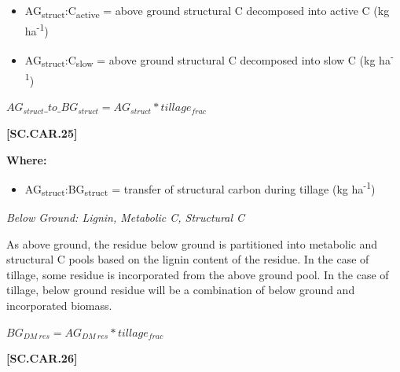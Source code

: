         \begin{itemize}
            \item AG\textsubscript{struct}:C\textsubscript{active} = above ground structural C decomposed into active C (kg ha\textsuperscript{-1})
            \item AG\textsubscript{struct}:C\textsubscript{slow} = above ground structural C decomposed into slow C (kg ha\textsuperscript{-1})
        \end{itemize}
        \vspace{0.5cm}

    \begin{center}
\(AG_{struct}\_to\_BG_{struct}=AG_{struct} * tillage_{frac}\)
    \end{center}
        \vspace{0.5cm} 
    
            {\raggedleft \textbf{[SC.CAR.25]}\par}
            \vspace{0.5cm}

        \textbf{Where:}

        \begin{itemize}
            \item AG\textsubscript{struct}:BG\textsubscript{struct} = transfer of structural carbon during tillage (kg ha\textsuperscript{-1})
        \end{itemize}
        \vspace{0.5cm}

\textit{Below Ground: Lignin, Metabolic C, Structural C}
\vspace{0.2cm}

As above ground, the residue below ground is partitioned into metabolic and structural C pools based on the lignin content of the residue. In the case of tillage, some residue is incorporated from the above ground pool. In the case of tillage, below ground residue will be a combination of below ground and incorporated biomass.
        \vspace{0.5cm}

    \begin{center}
\(BG_{DM\ res}=AG_{DM\ res} * tillage_{frac}\)
    \end{center}
        \vspace{0.5cm} 
    
            {\raggedleft \textbf{[SC.CAR.26]}\par}
            \vspace{0.5cm}

